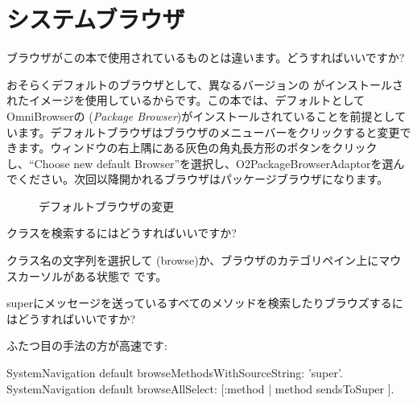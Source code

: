 \documentclass[a4paper,10pt,twoside]{book}
\begin{document}
\section{システムブラウザ}


\begin{faq}
ブラウザがこの本で使用されているものとは違います。どうすればいいですか?
\end{faq}
\answer
おそらくデフォルトのブラウザとして、異なるバージョンの  がインストールされたイメージを使用しているからです。この本では、デフォルトとして OmniBrowserの (\emph{Package Browser})がインストールされていることを前提としています。デフォルトブラウザはブラウザのメニューバーをクリックすると変更できます。ウィンドウの右上隅にある灰色の角丸長方形のボタンをクリックし、“Choose new default Browser”を選択し、O2PackageBrowserAdaptorを選んでください。次回以降開かれるブラウザはパッケージブラウザになります。

\begin{figure}[tbh]
	\centering
	\hfill
	\hfill
	\caption{デフォルトブラウザの変更}
\end{figure}

\begin{faq}
クラスを検索するにはどうすればいいですか?
\end{faq}
\answer
クラス名の文字列を選択して  (browse)か、ブラウザのカテゴリペイン上にマウスカーソルがある状態で  です。

\begin{faq}
superにメッセージを送っているすべてのメソッドを検索したりブラウズするにはどうすればいいですか?
\end{faq}
\answer
ふたつ目の手法の方が高速です:
\begin{code}{}
SystemNavigation default browseMethodsWithSourceString: 'super'.
SystemNavigation default browseAllSelect: [:method | method sendsToSuper ].
\end{code}
\end{document}
